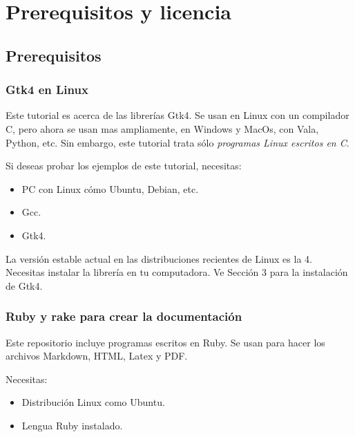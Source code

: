 \hypertarget{prerequisitos-y-licencia}{%
\section{Prerequisitos y licencia}\label{prerequisitos-y-licencia}}

\hypertarget{prerequisitos}{%
\subsection{Prerequisitos}\label{prerequisitos}}

\hypertarget{gtk4-en-linux}{%
\subsubsection{Gtk4 en Linux}\label{gtk4-en-linux}}

Este tutorial es acerca de las librerías Gtk4. Se usan en Linux con un
compilador C, pero ahora se usan mas ampliamente, en Windows y MacOs,
con Vala, Python, etc. Sin embargo, este tutorial trata sólo
\emph{programas Linux escritos en C}.

Si deseas probar los ejemplos de este tutorial, necesitas:

\begin{itemize}
\tightlist
\item
  PC con Linux cómo Ubuntu, Debian, etc.
\item
  Gcc.
\item
  Gtk4.
\end{itemize}

La versión estable actual en las distribuciones recientes de Linux es la
4. Necesitas instalar la librería en tu computadora. Ve Sección 3 para
la instalación de Gtk4.

\hypertarget{ruby-y-rake-para-crear-la-documentaciuxf3n}{%
\subsubsection{Ruby y rake para crear la
documentación}\label{ruby-y-rake-para-crear-la-documentaciuxf3n}}

Este repositorio incluye programas escritos en Ruby. Se usan para hacer
los archivos Markdown, HTML, Latex y PDF.

Necesitas:

\begin{itemize}
\tightlist
\item
  Distribución Linux como Ubuntu.
\item
  Lengua Ruby instalado.
\end{itemize}

